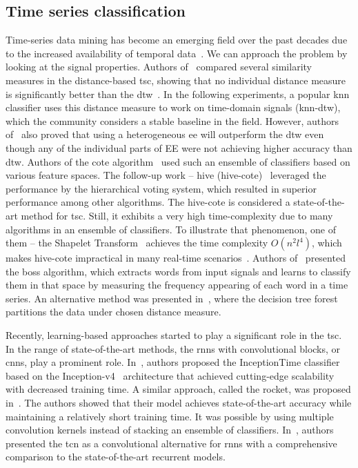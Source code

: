 \documentclass[a4paper, 10pt, twoside]{report}
\begin{document}
\subsection{Time series classification}

Time-series data mining has become an emerging field over the past decades due to the increased availability of temporal data~\cite{IsmailFawaz2019}. We can approach the problem by looking at the signal properties. Authors of~\cite{dtw_is_best} compared several similarity measures in the distance-based \acrfull{tsc}, showing that no individual distance measure is significantly better than the \acrfull{dtw}~\cite{DTW}. In the following experiments, a popular \acrfull{knn} classifier uses this distance measure to work on time-domain signals (\acrshort{knn}-\acrshort{dtw}), which the community considers a stable baseline in the field. However, authors of~\cite{dtw_is_best} also proved that using a heterogeneous \acrfull{ee} will outperform the \acrshort{dtw} even though any of the individual parts of EE were not achieving higher accuracy than \acrshort{dtw}. Authors of the \acrfull{cote} algorithm~\cite{cote} used such an ensemble of classifiers based on various feature spaces. The follow-up work -- \acrfull{hive} (\acrshort{hive}-\acrshort{cote})~\cite{hive-cote} leveraged the performance by the hierarchical voting system, which resulted in superior performance among other algorithms. The \acrshort{hive}-\acrshort{cote} is considered a state-of-the-art method for \acrshort{tsc}. Still, it exhibits a very high time-complexity due to many algorithms in an ensemble of classifiers. To illustrate that phenomenon, one of them -- the Shapelet Transform~\cite{shapelets} achieves the time complexity $O(n^{2}l^{4})$, which makes \acrshort{hive}-\acrshort{cote} impractical in many real-time scenarios~\cite{IsmailFawaz2019}. Authors of~\cite{BOSS} presented the \acrfull{boss} algorithm, which extracts words from input signals and learns to classify them in that space by measuring the frequency appearing of each word in a time series. An alternative method was presented in~\cite{ProximityForrest}, where the decision tree forest partitions the data under chosen distance measure. 

Recently, learning-based approaches started to play a significant role in the \acrshort{tsc}. In the range of state-of-the-art methods, the \acrshort{rnn}s with convolutional blocks, or \acrfull{cnn}s, play a prominent role. In~\cite{IsmailFawaz2020}, authors proposed the InceptionTime classifier based on the Inception-v4~\cite{inception} architecture that achieved cutting-edge scalability with decreased training time. A similar approach, called the \acrfull{rocket}, was proposed in~\cite{Dempster2020}. The authors showed that their model achieves state-of-the-art accuracy while maintaining a relatively short training time. It was possible by using multiple convolution kernels instead of stacking an ensemble of classifiers. In~\cite{bai2018empirical}, authors presented the \acrfull{tcn} as a convolutional alternative for \acrshort{rnn}s with a comprehensive comparison to the state-of-the-art recurrent models. 
\end{document}
